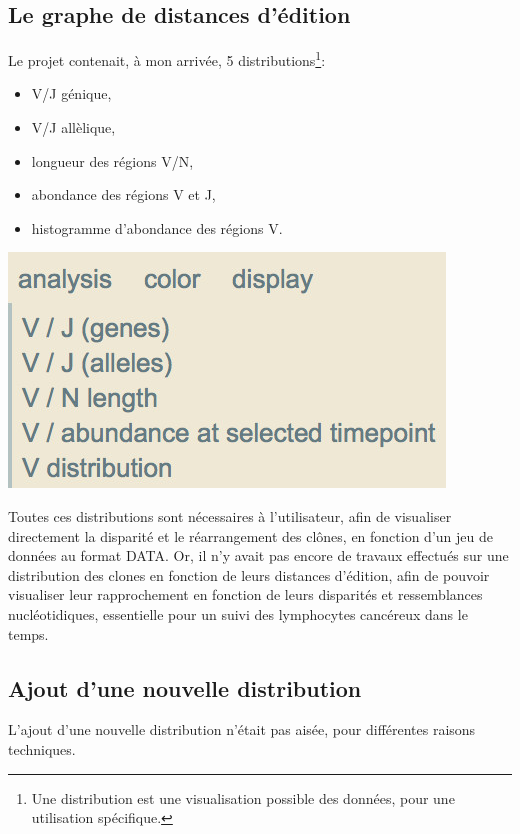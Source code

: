 \documentclass[pdftex,12pt,a4paper]{report}
\begin{document}
\begin{spacing}{1.2}
\chapter{Le graphe de distances d'édition}

Le projet contenait, à mon arrivée, 5 distributions\footnote{Une distribution est une visualisation possible des données, pour une utilisation spécifique.}:
\\[2mm]
\begin{minipage}{0.5\textwidth}
\begin{itemize}
\item V/J génique,
\item V/J allèlique,
\item longueur des régions V/N,
\item abondance des régions V et J,
\item histogramme d'abondance des régions V.
\end{itemize}
\end{minipage}
\begin{minipage}{0.5\textwidth}
	\includegraphics[width=\textwidth]{img/5distributions.jpg}
	\vfill
\end{minipage}

Toutes ces distributions sont nécessaires à l'utilisateur, afin de visualiser directement la disparité et le réarrangement des clônes, en fonction d'un jeu de données au format DATA. Or, il n'y avait pas encore de travaux effectués sur une distribution des clones en fonction de leurs distances d'édition, afin de pouvoir visualiser leur rapprochement en fonction de leurs disparités et ressemblances nucléotidiques, essentielle pour un suivi des lymphocytes cancéreux dans le temps.

\section{Ajout d'une nouvelle distribution}
L'ajout d'une nouvelle distribution n'était pas aisée, pour différentes raisons techniques.


\end{spacing}
\end{document}
